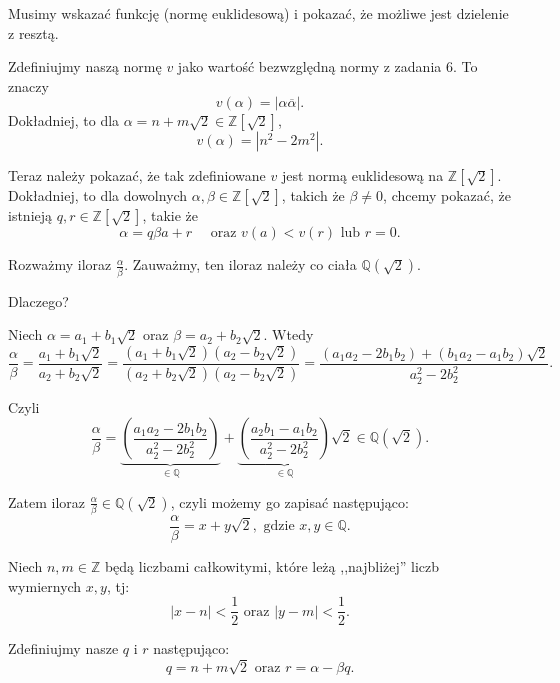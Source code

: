 \begin{solution}
	Musimy wskazać funkcję (normę euklidesową) i pokazać, że możliwe jest dzielenie z resztą. 

	Zdefiniujmy naszą normę $v$ jako wartość bezwzględną normy z zadania 6. To znaczy
	\[
	v\left( \alpha  \right) = \left| \alpha \overline{\alpha } \right| 
	.\] 
	Dokładniej, to dla $\alpha = n + m\sqrt{2}  \in \mathbb{Z} \left[ \sqrt{2}  \right] $,
	\[
	v\left( \alpha  \right) = \left| n^2 - 2m^2\right| 
	.\] 

	Teraz należy pokazać, że tak zdefiniowane $v$ jest normą euklidesową na $\mathbb{Z} \left[ \sqrt{2}  \right] $. Dokładniej, to dla dowolnych $\alpha , \beta \in \mathbb{Z} \left[ \sqrt{2}  \right] $, takich że $\beta \neq 0$, chcemy pokazać, że istnieją $q,r \in \mathbb{Z} \left[ \sqrt{2}  \right] $, takie że
	\[
	\alpha = q\beta a + r \quad \text{ oraz } v \left( a \right) < v\left( r \right) \text{ lub } r=0
	.\] 

	Rozważmy iloraz $\frac{\alpha}{\beta}$. Zauważmy, ten iloraz należy co ciała $\mathbb{Q} \left( \sqrt{2}  \right) $.

	\begin{remark}
	Dlaczego?

	Niech $\alpha = a_1 + b_1\sqrt{2} $ oraz $\beta = a_2 + b_2\sqrt{2} $. Wtedy
	\[
	\frac{\alpha}{\beta} = \frac{a_1+b_1\sqrt{2} }{a_2+b_2\sqrt{2} } = \frac{\left( a_1+b_1\sqrt{2}  \right)\left( a_2-b_2\sqrt{2}\right)}{\left( a_2+b_2\sqrt{2}  \right) \left( a_2-b_2\sqrt{2}  \right) } = \frac{(a_1a_2 - 2b_1b_2) + \left( b_1a_2-a_1b_2 \right)\sqrt{2}}{a_2^{2}-2b_2^{2}}
	.\] 

	Czyli
	\[
	\frac{\alpha }{\beta } = \underbrace{\left(\frac{a_1a_2-2b_1b_2}{a_2^{2}-2b_2^{2}}\right)}_{\in \mathbb{Q} } + \underbrace{\left(\frac{a_2b_1-a_1b_2}{a_2^2-2b_2^2}\right)}_{\in \mathbb{Q} }\sqrt{2} \in \mathbb{Q} \left( \sqrt{2}  \right) 
	.\] 
	\end{remark} 

	Zatem iloraz $\frac{\alpha }{\beta }\in \mathbb{Q} \left( \sqrt{2}  \right) $, czyli możemy go zapisać następująco:
	\[
	\frac{\alpha }{\beta } = x + y\sqrt{2}, \text{ gdzie } x,y \in \mathbb{Q}
	.\] 

	Niech $n,m \in \mathbb{Z} $ będą liczbami całkowitymi, które leżą ,,najbliżej'' liczb wymiernych $x,y$, tj:
	 \[
	\left| x - n \right| < \frac{1}{2} \text{ oraz } \left| y - m \right| < \frac{1}{2}
	.\] 

	Zdefiniujmy nasze $q$ i $r$ następująco:
	\[
	q = n + m\sqrt{2} \text{ oraz } r = \alpha - \beta q
	.\] 


\end{solution}
